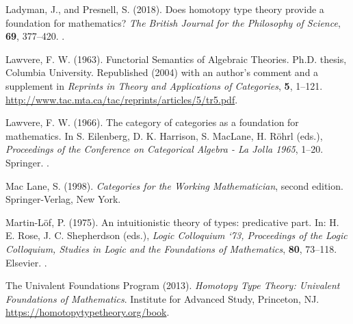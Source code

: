 \documentclass[11pt]{article}
\begin{document}
\begin{thebibliography}{}

Ladyman, J., and Presnell, S. (2018).
\newblock Does homotopy type theory provide a foundation for mathematics?
\newblock \emph{The British Journal for the Philosophy of Science},
    \textbf{69}, 377--420.
\newblock {}.

Lawvere, F. W. (1963).
\newblock Functorial Semantics of Algebraic Theories.
\newblock Ph.D. thesis, Columbia University.
\newblock Republished (2004) with an author’s comment and a supplement in
    \emph{Reprints in Theory and Applications of Categories}, \textbf{5},
    1--121.
\newblock \url{http://www.tac.mta.ca/tac/reprints/articles/5/tr5.pdf}.

Lawvere, F. W. (1966).
\newblock The category of categories as a foundation for mathematics.
\newblock In S. Eilenberg, D. K. Harrison, S. MacLane, H. Röhrl (eds.),
    \emph{Proceedings of the Conference on Categorical Algebra - La Jolla
    1965}, 1--20.
\newblock Springer.
\newblock {}.

Mac Lane, S. (1998).
\newblock \emph{Categories for the Working Mathematician}, second edition.
\newblock Springer-Verlag, New York.

Martin-L\"{o}f, P. (1975).
\newblock An intuitionistic theory of types: predicative part.
\newblock In: H. E. Rose, J. C. Shepherdson (eds.),
    \emph{Logic Colloquium ‘73, Proceedings of the Logic Colloquium,
    Studies in Logic and the Foundations of Mathematics}, \textbf{80}, 73--118.
\newblock Elsevier.
\newblock {}.

The Univalent Foundations Program (2013).
\newblock \emph{Homotopy Type Theory: Univalent Foundations of Mathematics}.
\newblock Institute for Advanced Study, Princeton, NJ.
\newblock \url{https://homotopytypetheory.org/book}.

\end{thebibliography}
\end{document}
